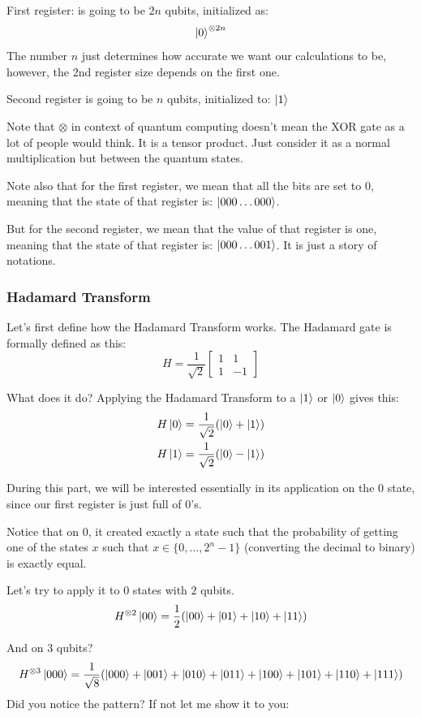 First register: is going to be $2n$ qubits, initialized as:
\[
\ket{0}^{\otimes 2n}
\]
The number $n$ just determines how accurate we want our calculations to be,
however, the 2nd register size depends on the first one.

Second register is going to be $n$ qubits, initialized to: $\ket{1}$

Note that $\otimes$ in context of quantum computing doesn't mean the XOR gate
as a lot of people would think. It is a tensor product. Just consider it as a
normal multiplication but between the quantum states.

Note also that for the first register, we mean that all the bits are set to
$0$, meaning that the state of that register is: $\ket{000\ldots000}$.

But for the second register, we mean that the value of that register is one,
meaning that the state of that register is: $\ket{000\ldots001}$. It is just
a story of notations.

\subsubsection{Hadamard Transform}

Let's first define how the Hadamard Transform works. The Hadamard gate is
formally defined as this:
$$
H = \frac{1}{\sqrt{2}}
\begin{bmatrix}
1 & 1 \\
1 & -1
\end{bmatrix}
$$

What does it do? Applying the Hadamard Transform to a $\ket{1}$ or $\ket{0}$
gives this:
\begin{align*}
H\ket{0} = \frac{1}{\sqrt{2}}(\ket{0} + \ket{1})\\
H\ket{1} = \frac{1}{\sqrt{2}}(\ket{0} - \ket{1})
\end{align*}

During this part, we will be interested essentially in its application on the
$0$ state, since our first register is just full of $0$'s.

Notice that on $0$, it created exactly a state such that the probability of
getting one of the states $x$ such that $x \in \{0, \ldots, 2^n - 1\}$
(converting the decimal to binary) is exactly equal.

Let's try to apply it to $0$ states with $2$ qubits.
$$
H^{\otimes 2} \ket{00} = \frac{1}{2}(\ket{00} + \ket{01} + \ket{10} + \ket{11})
$$

And on $3$ qubits?
$$
H^{\otimes 3} \ket{000} = \frac{1}{\sqrt{8}} (\ket{000} + \ket{001} + \ket{010}
+ \ket{011} + \ket{100} + \ket{101} + \ket{110} + \ket{111})
$$
Did you notice the pattern? If not let me show it to you:

